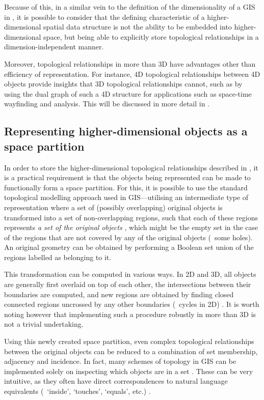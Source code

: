 Because of this, in a similar vein to the definition of the dimensionality of a GIS in \citet{Hazelton90}, it is possible to consider that the defining characteristic of a higher-dimensional spatial data structure is not the ability to be embedded into higher-dimensional space, but being able to explicitly store topological relationships in a dimension-independent manner.

Moreover, topological relationships in more than 3D have advantages other than efficiency of representation.
For instance, 4D topological relationships between 4D objects provide insights that 3D topological relationships cannot, such as by using the dual graph of such a 4D structure for applications such as space-time wayfinding and analysis.
This will be discussed in more detail in .

\subsection{Representing higher-dimensional objects as a space partition}
\label{ss:nd-partition}

In order to store the higher-dimensional topological relationships described in , it is a practical requirement is that the objects being represented can be made to functionally form a space partition.
For this, it is possible to use the standard topological modelling approach used in GIS---utilising an intermediate type of representation where a set of (possibly overlapping) original objects is transformed into a set of non-overlapping regions, such that each of these regions represents \emph{a set of the original objects} \citep{Rossignac89}, which might be the empty set in the case of the regions that are not covered by any of the original objects (\eg\ some holes).
An original geometry can be obtained by performing a Boolean set union of the regions labelled as belonging to it.

This transformation can be computed in various ways.
In 2D and 3D, all objects are generally first overlaid on top of each other, the intersections between their boundaries are computed, and new regions are obtained by finding closed connected regions uncrossed by any other boundaries (\eg\ cycles in 2D) \citep[\S{}2.3]{deBerg08}.
It is worth noting however that implementing such a procedure robustly in more than 3D is not a trivial undertaking.

Using this newly created space partition, even complex topological relationships between the original objects can be reduced to a combination of set membership, adjacency and incidence.
In fact, many schemes of topology in GIS can be implemented solely on inspecting which objects are in a set \citep{Egenhofer91,Worboys92a,Guting00}.
These can be very intuitive, as they often have direct correspondences to natural language equivalents (\eg\ `inside', `touches', `equals', etc.) \citep{Dube12}.

